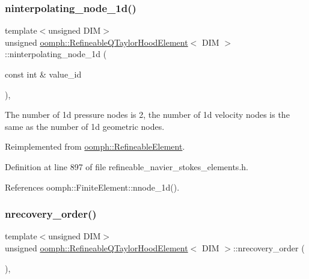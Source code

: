 \subsubsection{\texorpdfstring{ninterpolating\+\_\+node\+\_\+1d()}{ninterpolating\_node\_1d()}}
{\footnotesize\ttfamily template$<$unsigned D\+IM$>$ \\
unsigned \hyperlink{classoomph_1_1RefineableQTaylorHoodElement}{oomph\+::\+Refineable\+Q\+Taylor\+Hood\+Element}$<$ D\+IM $>$\+::ninterpolating\+\_\+node\+\_\+1d (\begin{DoxyParamCaption}\item[{const int \&}]{value\+\_\+id }\end{DoxyParamCaption})\hspace{0.3cm}{\ttfamily [inline]}, {\ttfamily [virtual]}}



The number of 1d pressure nodes is 2, the number of 1d velocity nodes is the same as the number of 1d geometric nodes. 



Reimplemented from \hyperlink{classoomph_1_1RefineableElement_a850180084aaf164550b4f4978b42cda7}{oomph\+::\+Refineable\+Element}.



Definition at line 897 of file refineable\+\_\+navier\+\_\+stokes\+\_\+elements.\+h.



References oomph\+::\+Finite\+Element\+::nnode\+\_\+1d().

\mbox{\label{classoomph_1_1RefineableQTaylorHoodElement_a44ffd481fbc9e2538500a150d7ced7aa}} 
\subsubsection{\texorpdfstring{nrecovery\+\_\+order()}{nrecovery\_order()}}
{\footnotesize\ttfamily template$<$unsigned D\+IM$>$ \\
unsigned \hyperlink{classoomph_1_1RefineableQTaylorHoodElement}{oomph\+::\+Refineable\+Q\+Taylor\+Hood\+Element}$<$ D\+IM $>$\+::nrecovery\+\_\+order (\begin{DoxyParamCaption}{ }\end{DoxyParamCaption})\hspace{0.3cm}{\ttfamily [inline]}, {\ttfamily [virtual]}}



